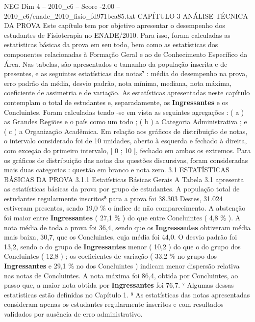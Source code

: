 \begin{textsample}{NEG Dim 4 – 2010\_c6 – Score -2.00 – 2010\_c6/enade\_2010\_fisio\_fd971bea85.txt}  \label{ex:f4_neg_045}
CAPÍTULO 3 ANÁLISE TÉCNICA DA PROVA Este capítulo tem por objetivo apresentar o desempenho dos estudantes de Fisioterapia no ENADE/2010.
Para isso, foram calculadas as estatísticas básicas da prova em seu todo, bem como as estatísticas dos componentes relacionadas à Formação Geral e ao de Conhecimento Específico da Área.
Nas tabelas, são apresentados o tamanho da população inscrita e de presentes, e as seguintes estatísticas das notas⁷ : média do desempenho na prova, erro padrão da média, desvio padrão, nota mínima, mediana, nota máxima, coeficiente de assimetria e de variação.
As estatísticas apresentadas neste capítulo contemplam o total de estudantes e, separadamente, os \textbf{Ingressantes} e os Concluintes.
Foram calculadas tendo -se em vista as seguintes agregações : ( a ) as Grandes Regiões e o país como um todo ; ( b ) a Categoria Administrativa ; e ( c ) a Organização Acadêmica.
Em relação aos gráficos de distribuição de notas, o intervalo considerado foi de 10 unidades, aberto à esquerda e fechado à direita, com exceção do primeiro intervalo, [ 0 ; 10 ], fechado em ambos os extremos.
Para os gráficos de distribuição das notas das questões discursivas, foram consideradas mais duas categorias : questão em branco e nota zero. 3.1 ESTATÍSTICAS BÁSICAS DA PROVA 3.1.1 Estatísticas Básicas Gerais A Tabela 3.1 apresenta as estatísticas básicas da prova por grupo de estudantes.
A população total de estudantes regularmente inscritos⁸ para a prova foi 38.303 Destes, 31.024 estiveram presentes, sendo 19,0 \% o índice de não comparecimento.
A abstenção foi maior entre \textbf{Ingressantes} ( 27,1 \% ) do que entre Concluintes ( 4,8 \% ).
A nota média de toda a prova foi 36,4, sendo que os \textbf{Ingressantes} obtiveram média mais baixa, 30,7, que os Concluintes, cuja média foi 44,0.
O desvio padrão foi 13,2, sendo o do grupo de \textbf{Ingressantes} menor ( 10,2 ) do que o do grupo dos Concluintes ( 12,8 ) ; os coeficientes de variação ( 33,2 \% no grupo dos \textbf{Ingressantes} e 29,1 \% no dos Concluintes ) indicam menor dispersão relativa nas notas de Concluintes.
A nota máxima foi 86,4, obtida por Concluintes, ao passo que, a maior nota obtida por \textbf{Ingressantes} foi 76,7. ⁷ Algumas dessas estatísticas estão definidas no Capítulo 1. ⁸ As estatísticas das notas apresentadas consideram apenas os estudantes regularmente inscritos e com resultados validados por ausência de erro administrativo.

\end{textsample}
